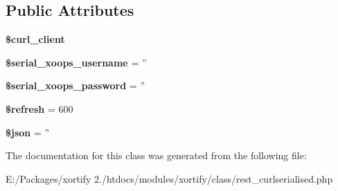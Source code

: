 \subsection*{Public Attributes}
\begin{DoxyCompactItemize}
\item 
\hypertarget{class_r_e_s_t___c_u_r_l_s_e_r_i_a_l_i_s_e_d_xortify_exchange_a920981837664e61120892d568554cf67}{{\bfseries \$curl\-\_\-client}}\label{class_r_e_s_t___c_u_r_l_s_e_r_i_a_l_i_s_e_d_xortify_exchange_a920981837664e61120892d568554cf67}

\item 
\hypertarget{class_r_e_s_t___c_u_r_l_s_e_r_i_a_l_i_s_e_d_xortify_exchange_a820b2a67eaf75b081d1b92990feb2277}{{\bfseries \$serial\-\_\-xoops\-\_\-username} = ''}\label{class_r_e_s_t___c_u_r_l_s_e_r_i_a_l_i_s_e_d_xortify_exchange_a820b2a67eaf75b081d1b92990feb2277}

\item 
\hypertarget{class_r_e_s_t___c_u_r_l_s_e_r_i_a_l_i_s_e_d_xortify_exchange_af5cf1afa435a37f679a0e8a30988de90}{{\bfseries \$serial\-\_\-xoops\-\_\-password} = ''}\label{class_r_e_s_t___c_u_r_l_s_e_r_i_a_l_i_s_e_d_xortify_exchange_af5cf1afa435a37f679a0e8a30988de90}

\item 
\hypertarget{class_r_e_s_t___c_u_r_l_s_e_r_i_a_l_i_s_e_d_xortify_exchange_ab80cc51ccc79c13eb26524a4c00e34c9}{{\bfseries \$refresh} = 600}\label{class_r_e_s_t___c_u_r_l_s_e_r_i_a_l_i_s_e_d_xortify_exchange_ab80cc51ccc79c13eb26524a4c00e34c9}

\item 
\hypertarget{class_r_e_s_t___c_u_r_l_s_e_r_i_a_l_i_s_e_d_xortify_exchange_ab9a6c2da2604c62741301d2e5830f085}{{\bfseries \$json} = ''}\label{class_r_e_s_t___c_u_r_l_s_e_r_i_a_l_i_s_e_d_xortify_exchange_ab9a6c2da2604c62741301d2e5830f085}

\end{DoxyCompactItemize}


The documentation for this class was generated from the following file\-:\begin{DoxyCompactItemize}
\item 
E\-:/\-Packages/xortify 2./htdocs/modules/xortify/class/rest\-\_\-curlserialised.\-php\end{DoxyCompactItemize}
